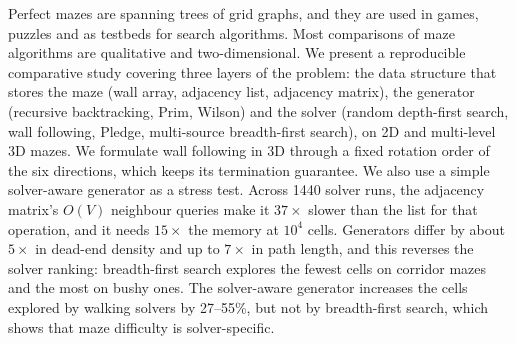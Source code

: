 Perfect mazes are spanning trees of grid graphs, and they are used in games, puzzles and as testbeds for search algorithms.
Most comparisons of maze algorithms are qualitative and two-dimensional.
We present a reproducible comparative study covering three layers of the problem: the data structure that stores the maze (wall array, adjacency list, adjacency matrix), the generator (recursive backtracking, Prim, Wilson) and the solver (random depth-first search, wall following, Pledge, multi-source breadth-first search), on 2D and multi-level 3D mazes.
We formulate wall following in 3D through a fixed rotation order of the six directions, which keeps its termination guarantee.
We also use a simple solver-aware generator as a stress test.
Across 1440 solver runs, the adjacency matrix's $O(V)$ neighbour queries make it $37\times$ slower than the list for that operation, and it needs $15\times$ the memory at $10^4$ cells.
Generators differ by about $5\times$ in dead-end density and up to $7\times$ in path length, and this reverses the solver ranking: breadth-first search explores the fewest cells on corridor mazes and the most on bushy ones.
The solver-aware generator increases the cells explored by walking solvers by 27--55\%, but not by breadth-first search, which shows that maze difficulty is solver-specific.

